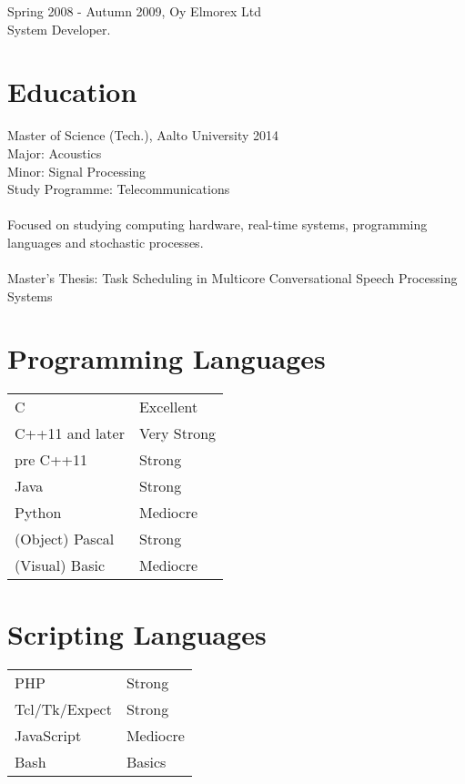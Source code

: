 \documentclass[12pt]{article}
\begin{document}
\large{Spring 2008 - Autumn 2009, Oy Elmorex Ltd}\\
\normalsize{System Developer.}\\


\section*{Education}

\large{Master of Science (Tech.), Aalto University 2014}\\
\normalsize{
Major: Acoustics\\
Minor: Signal Processing\\
Study Programme: Telecommunications\\
\\
Focused on studying computing hardware, real-time systems, programming 
languages and stochastic processes.\\
\\
Master's Thesis: Task Scheduling in Multicore Conversational Speech Processing
Systems
}


\section*{Programming Languages}

\begin{tabular}{ll}
C & Excellent\\
C++11 and later & Very Strong\\
pre C++11 & Strong\\
Java & Strong\\
Python & Mediocre\\
(Object) Pascal & Strong\\
(Visual) Basic & Mediocre
\end{tabular}


\section*{Scripting Languages}

\begin{tabular}{ll}
PHP & Strong\\
Tcl/Tk/Expect & Strong\\
JavaScript & Mediocre\\
Bash & Basics\\
\end{tabular}
\end{document}
